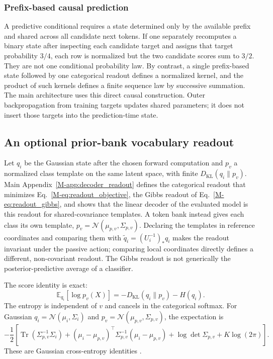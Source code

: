 \documentclass[twoside,11pt]{article}
\begin{document}
\subsubsection{Prefix-based causal prediction}
\label{sec:causal_prediction_scope}

A predictive conditional requires a state determined only by the available prefix and shared across all candidate next tokens. If one separately recomputes a binary state after inspecting each candidate target and assigns that target probability \(3/4\), each row is normalized but the two candidate scores sum to \(3/2\). They are not one conditional probability law. By contrast, a single prefix-based state followed by one categorical readout defines a normalized kernel, and the product of such kernels defines a finite sequence law by successive summation. The main architecture uses this direct causal construction. Outer backpropagation from training targets updates shared parameters; it does not insert those targets into the prediction-time state.

\subsection{An optional prior-bank vocabulary readout}
\label{sec:prior_bank_readout}

Let $q_i$ be the Gaussian state after the chosen forward computation and $p_v$ a normalized class template on the same latent space, with finite $D_{\mathrm{KL}}(q_i\|p_v)$. Main Appendix~\ref{M-app:decoder_readout} defines the categorical readout that minimizes Eq.~\eqref{M-eq:readout_objective}, the Gibbs readout of Eq.~\eqref{M-eq:readout_gibbs}, and shows that the linear decoder of the evaluated model is this readout for shared-covariance templates. A token bank instead gives each class its own template, $p_v=\mathcal N(\mu_{p,v},\Sigma_{p,v})$. Declaring the templates in reference coordinates and comparing them with $\widetilde q_i=(U_i^{-1})_*q_i$ makes the readout invariant under the passive action; comparing local coordinates directly defines a different, non-covariant readout. The Gibbs readout is not generically the posterior-predictive average of a classifier.

The score identity is exact:
\begin{equation}
\mathbb E_{q_i}[\log p_v(X)]
=-D_{\mathrm{KL}}(q_i\|p_v)-H(q_i).
\label{eq:readout_kl_decomposition}
\end{equation}
The entropy is independent of $v$ and cancels in the categorical softmax. For Gaussian $q_i=\mathcal N(\mu_i,\Sigma_i)$ and $p_v=\mathcal N(\mu_{p,v},\Sigma_{p,v})$, the expectation is
\begin{equation}
-\frac12\left[
\operatorname{Tr}(\Sigma_{p,v}^{-1}\Sigma_i)
+(\mu_i-\mu_{p,v})^\top\Sigma_{p,v}^{-1}(\mu_i-\mu_{p,v})
+\log\det\Sigma_{p,v}+K\log(2\pi)
\right].
\label{eq:readout_expected_loglik}
\end{equation}
These are Gaussian cross-entropy identities \citep{Bishop2006}.
\end{document}
